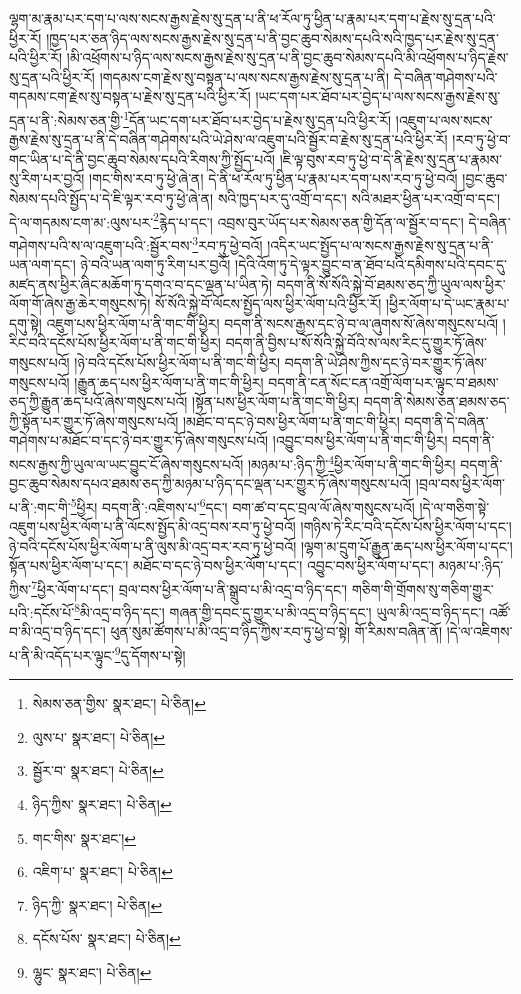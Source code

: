 ལྷག་མ་རྣམ་པར་དག་པ་ལས་སངས་རྒྱས་རྗེས་སུ་དྲན་པ་ནི་ཕ་རོལ་ཏུ་ཕྱིན་པ་རྣམ་པར་དག་པ་རྗེས་སུ་དྲན་པའི་ཕྱིར་རོ། །ཁྱད་པར་ཅན་ཉིད་ལས་སངས་རྒྱས་རྗེས་སུ་དྲན་པ་ནི་བྱང་ཆུབ་སེམས་དཔའི་སའི་ཁྱད་པར་རྗེས་སུ་དྲན་པའི་ཕྱིར་རོ། །མི་འཕྲོགས་པ་ཉིད་ལས་སངས་རྒྱས་རྗེས་སུ་དྲན་པ་ནི་བྱང་ཆུབ་སེམས་དཔའི་མི་འཕྲོགས་པ་ཉིད་རྗེས་སུ་དྲན་པའི་ཕྱིར་རོ། །གདམས་ངག་རྗེས་སུ་བསྟན་པ་ལས་སངས་རྒྱས་རྗེས་སུ་དྲན་པ་ནི། དེ་བཞིན་གཤེགས་པའི་གདམས་ངག་རྗེས་སུ་བསྟན་པ་རྗེས་སུ་དྲན་པའི་ཕྱིར་རོ། །ཡང་དག་པར་ཐོབ་པར་བྱེད་པ་ལས་སངས་རྒྱས་རྗེས་སུ་དྲན་པ་ནི་:སེམས་ཅན་གྱི་\footnote{སེམས་ཅན་གྱིས་  སྣར་ཐང་།  པེ་ཅིན། }དོན་ཡང་དག་པར་ཐོབ་པར་བྱེད་པ་རྗེས་སུ་དྲན་པའི་ཕྱིར་རོ། །འཇུག་པ་ལས་སངས་རྒྱས་རྗེས་སུ་དྲན་པ་ནི་དེ་བཞིན་གཤེགས་པའི་ཡེ་ཤེས་ལ་འཇུག་པའི་སྦྱོར་བ་རྗེས་སུ་དྲན་པའི་ཕྱིར་རོ། །རབ་ཏུ་ཕྱེ་བ་གང་ཡིན་པ་དེ་ནི་བྱང་ཆུབ་སེམས་དཔའི་རིགས་ཀྱི་སྤྱོད་པའོ། །ཇི་ལྟ་བུས་རབ་ཏུ་ཕྱེ་བ་དེ་ནི་རྗེས་སུ་དྲན་པ་རྣམས་སུ་རིག་པར་བྱའོ། །གང་གིས་རབ་ཏུ་ཕྱེ་ཞེ་ན། དེ་ནི་ཕ་རོལ་ཏུ་ཕྱིན་པ་རྣམ་པར་དག་པས་རབ་ཏུ་ཕྱེ་བའོ། །བྱང་ཆུབ་སེམས་དཔའི་སྤྱོད་པ་དེ་ཇི་ལྟར་རབ་ཏུ་ཕྱེ་ཞེ་ན། སའི་ཁྱད་པར་དུ་འགྲོ་བ་དང་། སའི་མཐར་ཕྱིན་པར་འགྲོ་བ་དང་། དེ་ལ་གདམས་ངག་མ་:ལུས་པར་\footnote{ལུས་པ་  སྣར་ཐང་།  པེ་ཅིན། }རྙེད་པ་དང་། འབྲས་བུར་ཡོད་པར་སེམས་ཅན་གྱི་དོན་ལ་སྦྱོར་བ་དང་། དེ་བཞིན་གཤེགས་པའི་ས་ལ་འཇུག་པའི་:སྦྱོར་བས་\footnote{སྦྱོར་བ་  སྣར་ཐང་།  པེ་ཅིན། }རབ་ཏུ་ཕྱེ་བའོ། །འདིར་ཡང་སྤྱོད་པ་ལ་སངས་རྒྱས་རྗེས་སུ་དྲན་པ་ནི་ཡན་ལག་དང་། ཉེ་བའི་ཡན་ལག་ཏུ་རིག་པར་བྱའོ། །དེའི་འོག་ཏུ་དེ་ལྟར་བྱུང་བ་ན་ཐོབ་པའི་དམིགས་པའི་དབང་དུ་མཛད་ནས་ཕྱིར་ཞིང་མཆོག་ཏུ་དགའ་བ་དང་ལྡན་པ་ཡིན་ཏེ། བདག་ནི་སོ་སོའི་སྐྱེ་བོ་ཐམས་ཅད་ཀྱི་ཡུལ་ལས་ཕྱིར་ལོག་གོ་ཞེས་རྒྱ་ཆེར་གསུངས་ཏེ། སོ་སོའི་སྐྱེ་བོ་ལོངས་སྤྱོད་ལས་ཕྱིར་ལོག་པའི་ཕྱིར་རོ། །ཕྱིར་ལོག་པ་དེ་ཡང་རྣམ་པ་དགུ་སྟེ། འཇུག་པས་ཕྱིར་ལོག་པ་ནི་གང་གི་ཕྱིར། བདག་ནི་སངས་རྒྱས་དང་ཉེ་བ་ལ་ཞུགས་སོ་ཞེས་གསུངས་པའོ། །རིང་བའི་དངོས་པོས་ཕྱིར་ལོག་པ་ནི་གང་གི་ཕྱིར། བདག་ནི་བྱིས་པ་སོ་སོའི་སྐྱེ་བོའི་ས་ལས་རིང་དུ་གྱུར་ཏོ་ཞེས་གསུངས་པའོ། །ཉེ་བའི་དངོས་པོས་ཕྱིར་ལོག་པ་ནི་གང་གི་ཕྱིར། བདག་ནི་ཡེ་ཤེས་ཀྱིས་དང་ཉེ་བར་གྱུར་ཏོ་ཞེས་གསུངས་པའོ། །རྒྱུན་ཆད་པས་ཕྱིར་ལོག་པ་ནི་གང་གི་ཕྱིར། བདག་ནི་ངན་སོང་ངན་འགྲོ་ལོག་པར་ལྟུང་བ་ཐམས་ཅད་ཀྱི་རྒྱུན་ཆད་པའོ་ཞེས་གསུངས་པའོ། །སྟོན་པས་ཕྱིར་ལོག་པ་ནི་གང་གི་ཕྱིར། བདག་ནི་སེམས་ཅན་ཐམས་ཅད་ཀྱི་སྟོན་པར་གྱུར་ཏོ་ཞེས་གསུངས་པའོ། །མཐོང་བ་དང་ཉེ་བས་ཕྱིར་ལོག་པ་ནི་གང་གི་ཕྱིར། བདག་ནི་དེ་བཞིན་གཤེགས་པ་མཐོང་བ་དང་ཉེ་བར་གྱུར་ཏོ་ཞེས་གསུངས་པའོ། །འབྱུང་བས་ཕྱིར་ལོག་པ་ནི་གང་གི་ཕྱིར། བདག་ནི་སངས་རྒྱས་ཀྱི་ཡུལ་ལ་ཡང་བྱུང་ངོ་ཞེས་གསུངས་པའོ། །མཉམ་པ་:ཉིད་ཀྱི་\footnote{ཉིད་ཀྱིས་  སྣར་ཐང་།  པེ་ཅིན། }ཕྱིར་ལོག་པ་ནི་གང་གི་ཕྱིར། བདག་ནི་བྱང་ཆུབ་སེམས་དཔའ་ཐམས་ཅད་ཀྱི་མཉམ་པ་ཉིད་དང་ལྡན་པར་གྱུར་ཏོ་ཞེས་གསུངས་པའོ། །བྲལ་བས་ཕྱིར་ལོག་པ་ནི་:གང་གི་\footnote{གང་གིས་  སྣར་ཐང་། }ཕྱིར། བདག་ནི་:འཇིགས་པ་\footnote{འཇིག་པ་  སྣར་ཐང་།  པེ་ཅིན། }དང་། བག་ཚ་བ་དང་བྲལ་ལོ་ཞེས་གསུངས་པའོ། །དེ་ལ་གཅིག་སྟེ་འཇུག་པས་ཕྱིར་ལོག་པ་ནི་ལོངས་སྤྱོད་མི་འདྲ་བས་རབ་ཏུ་ཕྱེ་བའོ། །གཉིས་ཏེ་རིང་བའི་དངོས་པོས་ཕྱིར་ལོག་པ་དང་། ཉེ་བའི་དངོས་པོས་ཕྱིར་ལོག་པ་ནི་ལུས་མི་འདྲ་བར་རབ་ཏུ་ཕྱེ་བའོ། །ལྷག་མ་དྲུག་པོ་རྒྱུན་ཆད་པས་ཕྱིར་ལོག་པ་དང་། སྟོན་པས་ཕྱིར་ལོག་པ་དང་། མཐོང་བ་དང་ཉེ་བས་ཕྱིར་ལོག་པ་དང་། འབྱུང་བས་ཕྱིར་ལོག་པ་དང་། མཉམ་པ་:ཉིད་ཀྱིས་\footnote{ཉིད་ཀྱི་  སྣར་ཐང་།  པེ་ཅིན། }ཕྱིར་ལོག་པ་དང་། བྲལ་བས་ཕྱིར་ལོག་པ་ནི་སྒྲུབ་པ་མི་འདྲ་བ་ཉིད་དང་། གཅིག་གི་གྲོགས་སུ་གཅིག་གྱུར་པའི་:དངོས་པོ་\footnote{དངོས་པོས་  སྣར་ཐང་།  པེ་ཅིན། }མི་འདྲ་བ་ཉིད་དང་། གཞན་གྱི་དབང་དུ་གྱུར་པ་མི་འདྲ་བ་ཉིད་དང་། ཡུལ་མི་འདྲ་བ་ཉིད་དང་། འཚོ་བ་མི་འདྲ་བ་ཉིད་དང་། ཕུན་སུམ་ཚོགས་པ་མི་འདྲ་བ་ཉིད་ཀྱིས་རབ་ཏུ་ཕྱེ་བ་སྟེ། གོ་རིམས་བཞིན་ནོ། །དེ་ལ་འཇིགས་པ་ནི་མི་འདོད་པར་ལྟུང་\footnote{ལྷུང་  སྣར་ཐང་།  པེ་ཅིན། }དུ་དོགས་པ་སྟེ། 